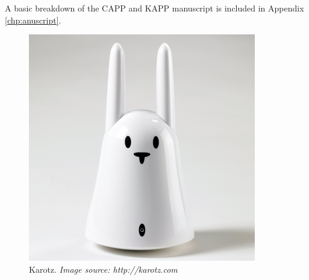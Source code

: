 A basic breakdown of the CAPP and KAPP manuscript is included in Appendix \ref{chp:anuscript}. 


\begin{figure}[H]
	\begin{minipage}[b]{0.4\linewidth}
		\centering
			\includegraphics[width=0.20\paperwidth]{Pictures/karotz.jpg}
		\caption{Karotz. \emph{Image source: http://karotz.com}}
		\label{fig:karotz}
	\end{minipage}
	\hspace{3cm}
	\begin{minipage}[b]{0.4\linewidth}
	\centering

\end{minipage}
\end{figure}
